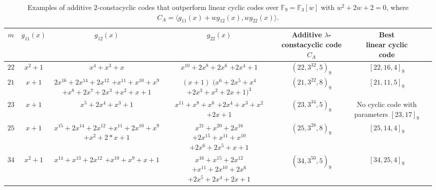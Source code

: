 \documentclass[12 pt]{extarticle}
\numberwithin{equation}{section}
\theoremstyle{definition}
\begin{document}
\begin{table}[h!]
    \centering
\small   \begin{tabular}{|c|c|c|c|c|c|c|}
    \hline
    $m$ & $g_{11}(x)$ &$g_{12}(x)$&$g_{22}(x)$&  \makecell{Additive\\ $\lambda$-constacyclic\\ code $C_A$} &\makecell{Best\\linear cyclic\\code}\\ 
    \hline
  $22$ & $x^2+1$   & $x^4 + x^3 + x$    & \makecell{$x^{10} + 2x^8 + 2x^6 $\\$+ 2x^4 + 1$}  & $(22,3^{32},5)_9$  &$[22,16,4]_9$\\
    \hline
 $21$  &  $x+1$  &  \makecell{$2x^{16} + 2x^{14} + 2x^{12} $\\$+ x^{11} + x^{10} + x^9 $\\$+ x^8 + 2x^7 + 2x^3 $\\$+
    x^2 + x + 1$}   &  \makecell{$(x+1)$\\$(x^6 + 2x^5 + x^4 $\\$+ 2x^3 + x^2 + 2x + 1)^3$}    & $(21,3^{22},8)_9$& $[21,11,5]_9$\\
    \hline
  $23$ & $x+1$    & $x^5 + 2x^4 + x^3 + 1$     & \makecell{$x^{11} + x^8 + x^6 $\\$+ 2x^4 + x^3 + x^2 $\\$+ 2x + 1$}    & $(23,3^{34},5)_9$  & \makecell{ No cyclic code\\ with parameters\\ $[23,17]_9$}\\
    \hline
  $25$ & $x+1$   &  \makecell{$x^{15} + 2x^{14} + 2x^{12} $\\$+ x^{11} + 2x^{10} + x^9 $\\$+ x^2 + 2*x + 1$}   & \makecell{$x^{21} + x^{20} + 2x^{16} $\\$+ 2x^{15} + x^{11} + x^{10} $\\$+ 2x^6 + 2x^5 + x + 1$}    & $(25,3^{28},8)_9$   & $[25,14,4]_9$\\
    \hline
$34$   & $x^2+1$   & \makecell{$x^{14} + x^{13} + 2x^{12} $\\$+ x^{10} + x^9 + x + 1$}    & \makecell{$x^{16} + x^{15} + 2x^{12} $\\$+ x^{11} + 2x^{10} + 2x^6 $\\$+ 2x^5 + 2x^4 + 2x + 1$}   &  $(34,3^{50},5)_9$& $[34,25,4]_9$\\
    \hline
    \end{tabular}
    \caption{ Examples of additive $2$-constacyclic codes that outperform linear cyclic codes over $\mathbb{F}_9=\mathbb{F}_3[w]$ with $w^2+2w+2=0$, where $C_A=\langle g_{11}(x)+wg_{12}(x),wg_{22}(x)\rangle$.}
    \label{tab3}
\end{table}
\end{document}
